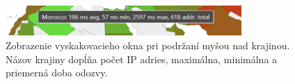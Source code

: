 \begin{figure}
    \centerline{\includegraphics[width=0.8\textwidth]{images/country_ping_tooltip}}
    \caption[Zobrazenie vyskakovacieho okna pri podržaní myšou nad krajinou]{Zobrazenie vyskakovacieho okna pri podržaní myšou nad krajinou. Názov krajiny dopĺňa
    počet IP adries, maximálna, minimálna a priemerná doba odozvy.}
    \label{obr:country_ping_tooltip}
\end{figure}